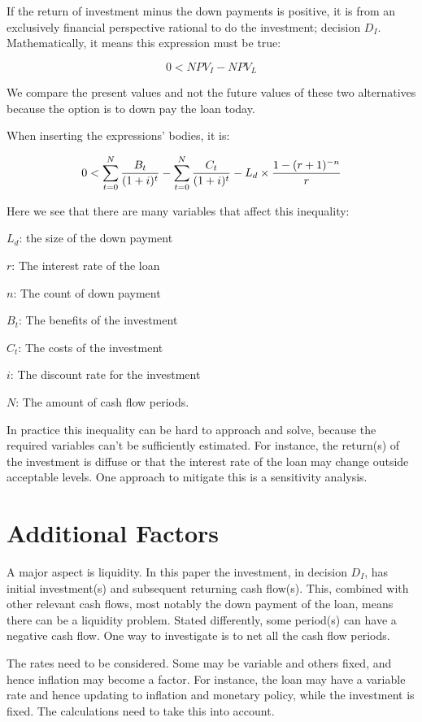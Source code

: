 \documentclass[a4paper]{article}
\begin{document}
If the return of investment minus the down payments is positive, it is from an
exclusively financial perspective rational to do the investment; decision $D_I$.
Mathematically, it means this expression must be true:

\begin{equation}
0 < NPV_I - NPV_L
\end{equation}

We compare the present values and not the future values of these two
alternatives because the option is to down pay the loan today.

When inserting the expressions' bodies, it is:

\begin{equation}
0 < \NPV_I - \NPVL
\end{equation}

Here we see that there are many variables that affect this inequality:

$L_d$: the size of the down payment

$r$: The interest rate of the loan

$n$: The count of down payment

$B_t$: The benefits of the investment

$C_t$: The costs of the investment

$i$: The discount rate for the investment

$N$: The amount of cash flow periods.

In practice this inequality can be hard to approach and solve, because the
required variables can't be sufficiently estimated. For instance, the return(s)
of the investment is diffuse or that the interest rate of the loan may change
outside acceptable levels. One approach to mitigate this is a sensitivity
analysis.

\section{Additional Factors}

A major aspect is liquidity. In this paper the investment, in decision $D_I$,
has initial investment(s) and subsequent returning cash flow(s). This, combined
with other relevant cash flows, most notably the down payment of the loan, means
there can be a liquidity problem. Stated differently, some period(s) can have a
negative cash flow. One way to investigate is to net all the cash flow periods.

The rates need to be considered. Some may be variable and others fixed, and
hence inflation may become a factor. For instance, the loan may have a variable
rate and hence updating to inflation and monetary policy, while the investment
is fixed. The calculations need to take this into account.
\end{document}
